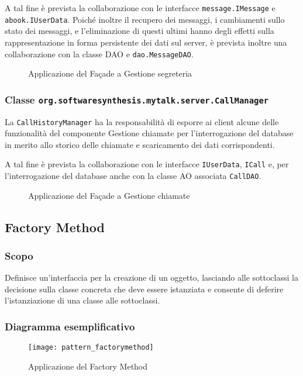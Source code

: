 A tal fine è prevista la collaborazione con le interfacce \texttt{message.IMessage} e \texttt{abook.IUserData}. Poiché inoltre il recupero dei messaggi, i cambiamenti sullo stato dei messaggi, e l'eliminazione di questi ultimi hanno degli effetti sulla rappresentazione in forma persistente dei dati sul server, è prevista inoltre una collaborazione con la classe DAO e \texttt{dao.MessageDAO}.

\begin{figure}[H]
  \centering
  \caption{Applicazione del  Façade a \textsf{Gestione segreteria}}\label{fig:facademessage}
\end{figure}

\subsubsection*{Classe \texttt{org.softwaresynthesis.mytalk.server.CallManager}}
La  \texttt{CallHistoryManager} ha la responsabilità di esporre ai client alcune delle funzionalità del componente \textsf{Gestione chiamate} per l'interrogazione del database in merito allo storico delle chiamate e scaricamento dei dati corrispondenti.

A tal fine è prevista la collaborazione con le interfacce \texttt{IUserData}, \texttt{ICall} e, per l'interrogazione del database anche con la classe AO associata \texttt{CallDAO}.

\begin{figure}[H]
  \centering
  \caption{Applicazione del  Façade a \textsf{Gestione chiamate}}\label{fig:facadecall}
\end{figure}

\subsection{Factory Method}

\subsubsection{Scopo}
Definisce un'interfaccia per la creazione di un oggetto, lasciando alle sottoclassi la decisione sulla classe concreta che deve essere istanziata e consente di deferire l'istanziazione di una classe alle sottoclassi.

\subsubsection{Diagramma esemplificativo}
\begin{figure}[H]
  \centering
  \texttt{[image: pattern\_factorymethod]}
  \caption{Applicazione del  Factory Method}\label{fig:factory_method}
\end{figure}

